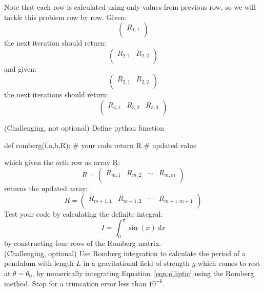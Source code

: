 Note that each row is calculated using only values from previous row, so we will tackle this problem row by row.
Given:
\begin{displaymath}
\begin{pmatrix}
R_{1,1} \\
\end{pmatrix}
\end{displaymath}
the next iteration should return:
\begin{displaymath}
\begin{pmatrix}
R_{2,1} & R_{2,2} \\
\end{pmatrix}
\end{displaymath}
and given:
\begin{displaymath}
\begin{pmatrix}
R_{2,1} & R_{2,2} \\
\end{pmatrix}
\end{displaymath}
the next iterations should return:
\begin{displaymath}
\begin{pmatrix}
R_{3,1} & R_{3,2} & R_{3,3}\\
\end{pmatrix}
\end{displaymath}

\newpage

\plot (Challenging, not optional) Define  python function
\begin{python}
def romberg(f,a,b,R):
   # your code
   return R # updated value
\end{python}
which given the $m$th row as array R:
\begin{displaymath}
R = 
\begin{pmatrix}
R_{m,1} & R_{m,2} & \cdots & R_{m,m}\\
\end{pmatrix}
\end{displaymath}
returns the updated array:
\begin{displaymath}
R = 
\begin{pmatrix}
R_{m+1,1} & R_{m+1,2} & \cdots & R_{m+1,m+1}\\
\end{pmatrix}
\end{displaymath}
Test your code by calculating the definite integral:
\begin{displaymath}
I = \int_0^\pi \sin(x) \, dx
\end{displaymath}
by constructing four rows of the Romberg matrix.\\

\plot (Challenging, optional) Use Romberg integration to calculate the
period of a pendulum with length $L$ in a gravitational field of
strength $g$ which comes to rest at $\theta = \theta_0$, by
numerically integrating Equation~\ref{eqn:elliptic} using the Romberg
method.  Stop for a truncation error less than $10^{-6}$.
